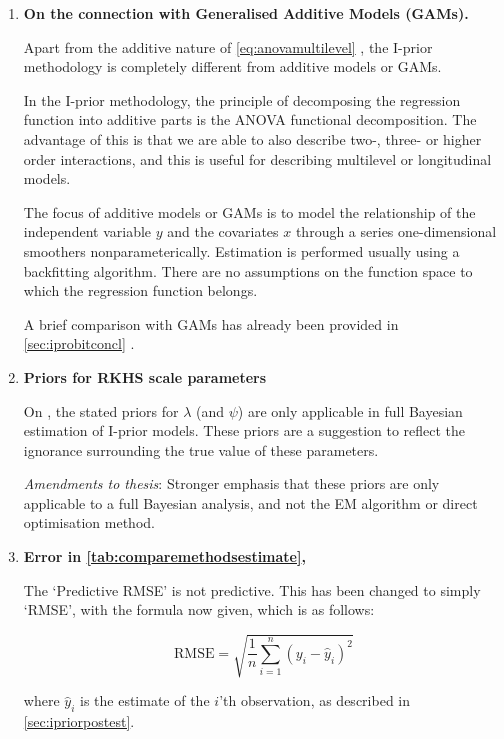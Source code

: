 \documentclass[11pt,openright,twoside]{report}
\begin{document}
\begin{enumerate}
  \item \textbf{On the connection with Generalised Additive Models (GAMs).}
  
  Apart from the additive nature of \cref{eq:anovamultilevel} , the I-prior methodology is completely different from additive models or GAMs.
  
  In the I-prior methodology, the principle of decomposing the regression function into additive parts is the ANOVA functional decomposition.
  The advantage of this is that we are able to also describe two-, three- or higher order interactions, and this is useful for describing multilevel or longitudinal models.
  
  The focus of additive models or GAMs is to model the relationship of the independent variable $y$ and the covariates $x$ through a series one-dimensional smoothers nonparameterically.
  Estimation is performed usually using a backfitting algorithm.
  There are no assumptions on the function space to which the regression function belongs.
  
  A brief comparison with GAMs has already been provided in \cref{sec:iprobitconcl} .

  \item \textbf{Priors for RKHS scale parameters}
  
  On , the stated priors for $\lambda$ (and $\psi$) are only applicable in full Bayesian estimation of I-prior models.
  These priors are a suggestion to reflect the ignorance surrounding the true value of these parameters.
  
  \textit{Amendments to thesis}: Stronger emphasis that these priors are only applicable to a full Bayesian analysis, and not the EM algorithm or direct optimisation method.
  
  \item \textbf{Error in \cref{tab:comparemethodsestimate}, }

  The `Predictive RMSE' is not predictive. This has been changed to simply `RMSE', with the formula now given, which is as follows:

  \begin{equation}
    \text{RMSE} = \sqrt{\frac{1}{n}\sum_{i=1}^n (y_i - \hat y_i)^2}
  \end{equation}
  
  where $\hat y_i$ is the estimate of the $i$'th observation, as described in \cref{sec:ipriorpostest}.


\end{enumerate}
\end{document}
